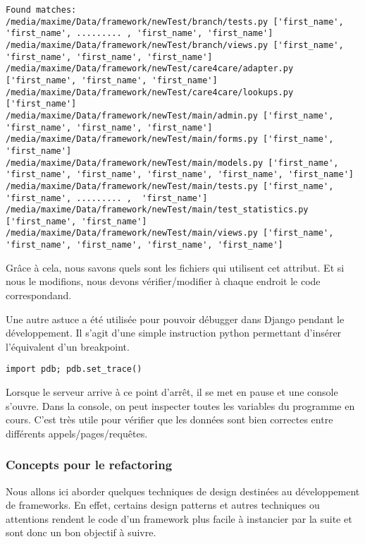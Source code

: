 \begin{lstlisting}
Found matches:
/media/maxime/Data/framework/newTest/branch/tests.py ['first_name', 'first_name', ......... , 'first_name', 'first_name']
/media/maxime/Data/framework/newTest/branch/views.py ['first_name', 'first_name', 'first_name', 'first_name']
/media/maxime/Data/framework/newTest/care4care/adapter.py ['first_name', 'first_name', 'first_name']
/media/maxime/Data/framework/newTest/care4care/lookups.py ['first_name']
/media/maxime/Data/framework/newTest/main/admin.py ['first_name', 'first_name', 'first_name', 'first_name']
/media/maxime/Data/framework/newTest/main/forms.py ['first_name', 'first_name']
/media/maxime/Data/framework/newTest/main/models.py ['first_name', 'first_name', 'first_name', 'first_name', 'first_name', 'first_name']
/media/maxime/Data/framework/newTest/main/tests.py ['first_name', 'first_name', ......... ,  'first_name']
/media/maxime/Data/framework/newTest/main/test_statistics.py ['first_name', 'first_name']
/media/maxime/Data/framework/newTest/main/views.py ['first_name', 'first_name', 'first_name', 'first_name', 'first_name']
\end{lstlisting}

Grâce à cela,  nous savons quels sont les fichiers qui utilisent cet attribut.  Et si nous le modifions,  nous devons vérifier/modifier à chaque endroit le code correspondand. 

Une autre astuce a été utilisée pour pouvoir débugger dans Django pendant le développement.  Il s'agit d'une simple instruction python permettant d'insérer l'équivalent d'un breakpoint. 
\begin{lstlisting}
import pdb; pdb.set_trace()
\end{lstlisting}
Lorsque le serveur arrive à ce point d'arrêt,  il se met en pause et une console s'ouvre.  
Dans la console,  on peut inspecter toutes les variables du programme en cours.  C'est très utile pour vérifier que les données sont bien correctes entre différents appels/pages/requêtes.

\subsubsection{Concepts pour le refactoring}

Nous allons ici aborder quelques techniques de design destinées au développement de frameworks.  En effet,  certains design patterns et autres techniques ou attentions rendent le code d'un framework plus facile à instancier par la suite et sont donc un bon objectif à suivre.

